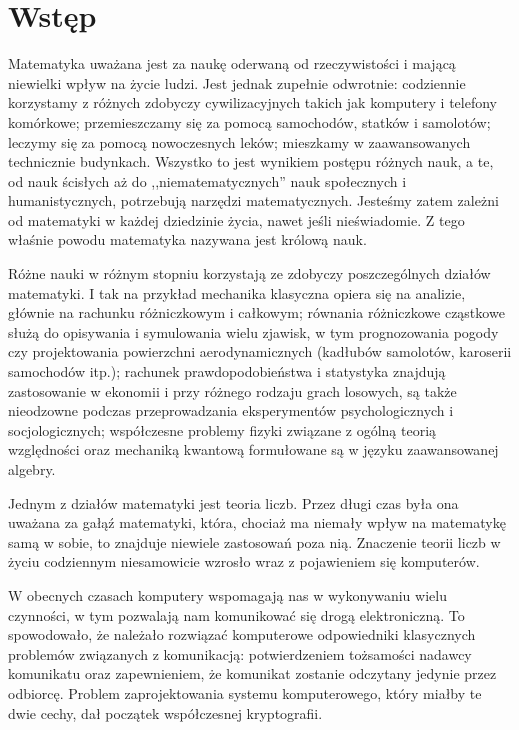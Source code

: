 \chapter*{Wstęp}

\noindent
Matematyka uważana jest za naukę oderwaną od rzeczywistości
i mającą niewielki wpływ na życie ludzi.
Jest jednak zupełnie odwrotnie:
codziennie korzystamy z różnych zdobyczy cywilizacyjnych
takich jak komputery i telefony komórkowe;
przemieszczamy się za pomocą samochodów, statków i samolotów;
leczymy się za pomocą nowoczesnych leków;
mieszkamy w zaawansowanych technicznie budynkach.
Wszystko to jest wynikiem postępu różnych nauk,
a te, od nauk ścisłych
aż do ,,niematematycznych'' nauk społecznych i humanistycznych,
potrzebują narzędzi matematycznych.
Jesteśmy zatem zależni od matematyki w każdej dziedzinie życia,
nawet jeśli nieświadomie.
Z tego właśnie powodu matematyka nazywana jest królową nauk.

\noindent
Różne nauki w różnym stopniu korzystają ze zdobyczy
poszczególnych działów matematyki.
I tak na przykład
mechanika klasyczna opiera się na analizie,
głównie na rachunku różniczkowym i całkowym;
równania różniczkowe cząstkowe służą
do opisywania i symulowania wielu zjawisk,
w tym prognozowania pogody czy projektowania powierzchni aerodynamicznych
(kadłubów samolotów, karoserii samochodów itp.);
rachunek prawdopodobieństwa i statystyka
znajdują zastosowanie w ekonomii i przy różnego rodzaju grach losowych,
są także nieodzowne
podczas przeprowadzania eksperymentów psychologicznych i socjologicznych;
współczesne problemy fizyki
związane z ogólną teorią względności oraz mechaniką kwantową
formułowane są w języku zaawansowanej algebry.

\noindent
Jednym z działów matematyki jest teoria liczb.
Przez długi czas była ona uważana za gałąź matematyki,
która, chociaż ma niemały wpływ na matematykę samą w sobie,
to znajduje niewiele zastosowań poza nią.
Znaczenie teorii liczb w życiu codziennym
niesamowicie wzrosło wraz z pojawieniem się komputerów.

\noindent
W obecnych czasach komputery wspomagają nas w wykonywaniu wielu czynności,
w tym pozwalają nam komunikować się drogą elektroniczną.
To spowodowało, że należało rozwiązać komputerowe odpowiedniki
klasycznych problemów związanych z komunikacją:
potwierdzeniem tożsamości nadawcy komunikatu
oraz zapewnieniem, że komunikat zostanie odczytany jedynie przez odbiorcę.
Problem zaprojektowania systemu komputerowego,
który miałby te dwie cechy,
dał początek współczesnej kryptografii.

